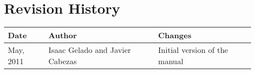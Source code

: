\chapter{Revision History}
\begin{tabularx}{\linewidth}{|l|X|X|}
\hline
\textbf{Date} & \textbf{Author} & \textbf{Changes} \\
\hline
May, 2011 & Isaac Gelado and Javier Cabezas & Initial version of the manual \\
\hline
\end{tabularx}

